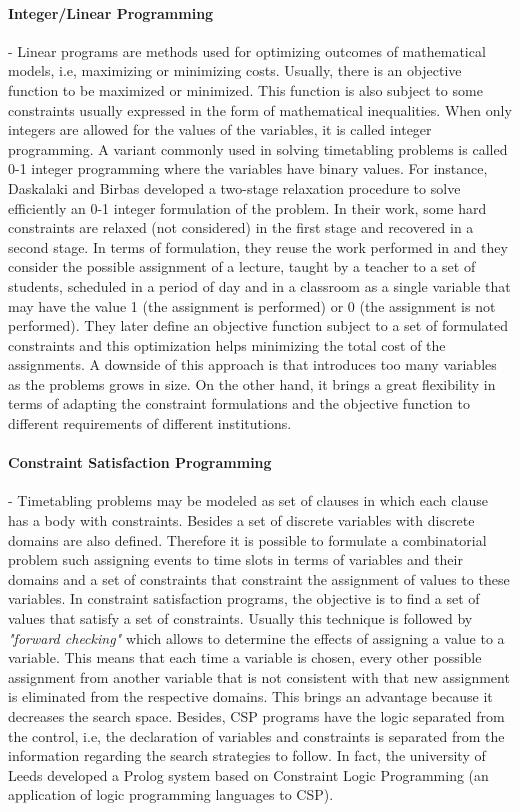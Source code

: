 \paragraph{\textbf{Integer/Linear Programming}} - Linear programs are methods used for optimizing outcomes of mathematical models, i.e, maximizing or minimizing costs. Usually, there is an objective function to be maximized or minimized. This function is also subject to some constraints usually expressed in the form of mathematical inequalities. When only integers are allowed for the values of the variables, it is called integer programming. A variant commonly used in solving timetabling problems is called 0-1 integer programming where the variables have binary values. For instance, Daskalaki and Birbas \citep{daskalaki2005efficient} developed a two-stage relaxation procedure to solve efficiently an 0-1 integer formulation of the problem. In their work, some hard constraints are relaxed (not considered) in the first stage and recovered in a second stage. In terms of formulation, they reuse the work performed in \citep{daskalaki2004integer} and they consider the possible assignment of a lecture, taught by a teacher to a set of students, scheduled in a period of day and in a classroom as a single variable that may have the value 1 (the assignment is performed) or 0 (the assignment is not performed). They later define an objective function subject to a set of formulated constraints and this optimization helps minimizing the total cost of the assignments. A downside of this approach is that introduces too many variables as the problems grows in size. On the other hand, it brings a great flexibility in terms of adapting the constraint formulations and the objective function to different requirements of different institutions.

\paragraph{\textbf{Constraint Satisfaction Programming}} - Timetabling problems may be modeled as set of clauses in which each clause has a body with constraints. Besides a set of discrete variables with discrete domains are also defined. Therefore it is possible to formulate a combinatorial problem such assigning events to time slots in terms of variables and their domains and a set of constraints that constraint the assignment of values to these variables. In constraint satisfaction programs, the objective is to find a set of values that satisfy a set of constraints. Usually this technique is followed by \textit{"forward checking"} which allows to determine the effects of assigning a value to a variable. This means that each time a variable is chosen, every other possible  assignment from another variable that is not consistent with that new assignment is eliminated from the respective domains. This brings an advantage because it decreases the search space. Besides, CSP programs have the logic separated from the control, i.e, the declaration of variables and constraints is separated from the information regarding the search strategies to follow. In fact, the university of Leeds \citep{leed_clp} developed a Prolog system based on Constraint Logic Programming (an application of logic programming languages to CSP).

